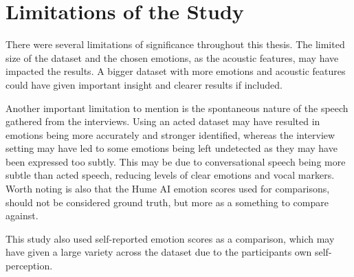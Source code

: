 \section{Limitations of the Study}
\label{sec:con-limitations}
There were several limitations of significance throughout this thesis. The limited size of the dataset and the chosen emotions, as the acoustic features, may have impacted the results. A bigger dataset with more emotions and acoustic features could have given important insight and clearer results if included.

Another important limitation to mention is the spontaneous nature of the speech gathered from the interviews. Using an acted dataset may have resulted in emotions being more accurately and stronger identified, whereas the interview setting may have led to some emotions being left undetected as they may have been expressed too subtly. This may be due to conversational speech being more subtle than acted speech, reducing levels of clear emotions and vocal markers.
Worth noting is also that the Hume AI emotion scores used for comparisons, should not be considered ground truth, but more as a something to compare against.  

This study also used self-reported emotion scores as a comparison, which may have given a large variety across the dataset due to the participants own self-perception.
